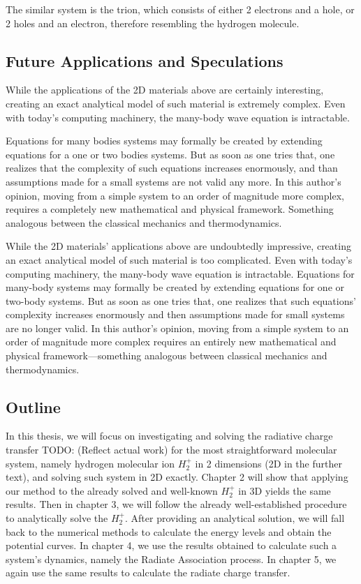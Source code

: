 The similar system is the trion, which consists of either 2 electrons and a hole, or 2 holes and an electron, therefore resembling the hydrogen molecule. 

\subsection*{Future Applications and Speculations}

While the applications of the 2D materials above are certainly interesting, creating an exact analytical  model of such material is extremely complex. Even with today's computing machinery, the many-body wave equation is intractable.  

Equations for many bodies systems may formally be created by extending equations for a one or two bodies systems. But as soon as one tries that, one realizes that the complexity of such equations increases enormously, and than assumptions  made for a small systems are not valid any more. In this author's opinion, moving from a simple system to an order of magnitude more complex, requires a completely new mathematical and physical framework. Something analogous between the classical mechanics and thermodynamics.

While the 2D materials' applications above are undoubtedly impressive, creating an exact analytical model of such material is too complicated. Even with today's computing machinery, the many-body wave equation is intractable.  Equations for many-body systems may formally be created by extending equations for one or two-body systems. But as soon as one tries that, one realizes that such equations' complexity increases enormously and then assumptions made for small systems are no longer valid. In this author's opinion, moving from a simple system to an order of magnitude more complex requires an entirely new mathematical and physical framework—something analogous between classical mechanics and thermodynamics.

\subsection*{Outline}
In this thesis, we will focus on investigating and solving the radiative charge transfer TODO: (Reflect actual work) for the most straightforward molecular system, namely hydrogen molecular ion $ {H_2^{+}}  $ in 2 dimensions (2D in the further text), and solving such system in 2D exactly.  Chapter 2 will show that applying our method to the already solved and well-known $ {H_2^{+}} $ in 3D yields the same results. Then in chapter 3, we will follow the already well-established procedure \cite{Bates1} to analytically solve the $ {H_2^{+}} $. After providing an analytical solution, we will fall back to the numerical methods to calculate the energy levels and obtain the potential curves. In chapter 4, we use the results obtained to calculate such a system's dynamics, namely the Radiate Association process. In chapter 5, we again use the same results to calculate the radiate charge transfer. 


